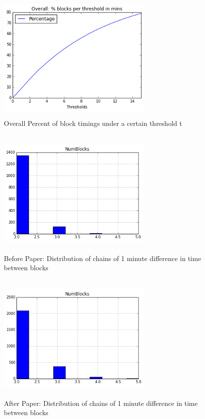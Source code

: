 \documentclass{sig-alternate-05-2015}
\begin{document}
\begin{figure}
\centering
\includegraphics[height=2.5in, width=3in]{overall.png}
\caption{ Overall Percent of block timings under a certain threshold t}
\end{figure}

\begin{figure}
\centering
\includegraphics[height=2.5in, width=3in]{before_one_dist.png}
\caption{ Before Paper: Distribution of chains of 1 minute difference in time between blocks}
\end{figure}


\begin{figure}
\centering
\includegraphics[height=2.5in, width=3in]{after_one_dist.png}
\caption{ After Paper: Distribution of chains of 1 minute difference in time between blocks}
\end{figure}
\end{document}
